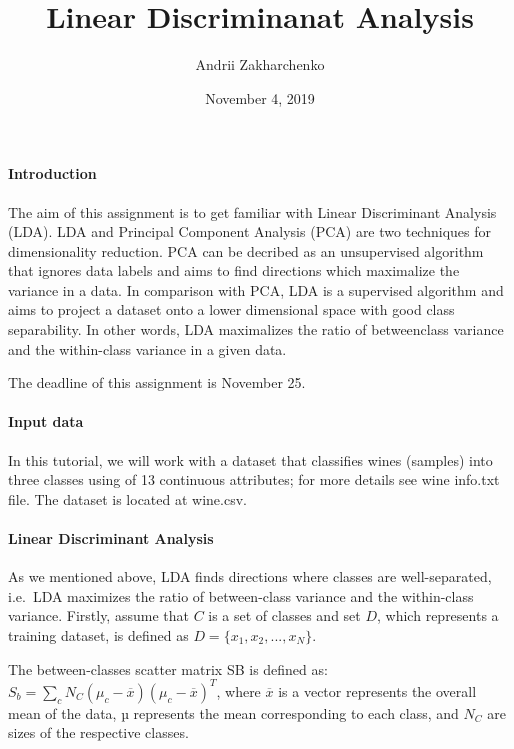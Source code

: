 \documentclass[]{article}
\title{Linear Discriminanat Analysis}
\author{Andrii Zakharchenko}
\date{November 4, 2019}
\let\oldparagraph\paragraph
\renewcommand{\paragraph}[1]{\oldparagraph{#1}\mbox{}}
\begin{document}
\maketitle

\hypertarget{introduction}{%
\paragraph{Introduction}\label{introduction}}

The aim of this assignment is to get familiar with Linear Discriminant
Analysis (LDA). LDA and Principal Component Analysis (PCA) are two
techniques for dimensionality reduction. PCA can be decribed as an
unsupervised algorithm that ignores data labels and aims to find
directions which maximalize the variance in a data. In comparison with
PCA, LDA is a supervised algorithm and aims to project a dataset onto a
lower dimensional space with good class separability. In other words,
LDA maximalizes the ratio of betweenclass variance and the within-class
variance in a given data.

The deadline of this assignment is November 25.

\hypertarget{input-data}{%
\paragraph{Input data}\label{input-data}}

In this tutorial, we will work with a dataset that classifies wines
(samples) into three classes using of 13 continuous attributes; for more
details see wine info.txt file. The dataset is located at wine.csv.

\hypertarget{linear-discriminant-analysis}{%
\paragraph{Linear Discriminant
Analysis}\label{linear-discriminant-analysis}}

As we mentioned above, LDA finds directions where classes are
well-separated, i.e.~LDA maximizes the ratio of between-class variance
and the within-class variance. Firstly, assume that \(C\) is a set of
classes and set \(D\), which represents a training dataset, is defined
as \(D = \{x_1, x_2, . . . , x_N \}\).

The between-classes scatter matrix SB is defined as:
\(S_b = \sum_c N_C(\mu_c -\overline{x})(\mu_c - \overline{x})^T\), where
\(\overline{x}\) is a vector represents the overall mean of the data, µ
represents the mean corresponding to each class, and \(N_C\) are sizes
of the respective classes.
\end{document}
